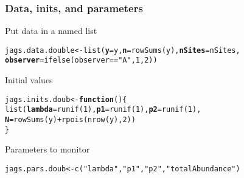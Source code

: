 \documentclass[color=usenames,dvipsnames]{beamer}\usepackage[]{graphicx}\usepackage[]{xcolor}
\makeatletter
\newcommand{\hlnum}[1]{\textcolor[rgb]{0.69,0.494,0}{#1}}%
\newcommand{\hlsng}[1]{\textcolor[rgb]{0.749,0.012,0.012}{#1}}%
\newcommand{\hlopt}[1]{\textcolor[rgb]{0,0,0}{#1}}%
\newcommand{\hldef}[1]{\textcolor[rgb]{0,0,0}{#1}}%
\newcommand{\hlkwa}[1]{\textcolor[rgb]{0,0,0}{\textbf{#1}}}%
\newcommand{\hlkwb}[1]{\textcolor[rgb]{0,0.341,0.682}{#1}}%
\newcommand{\hlkwc}[1]{\textcolor[rgb]{0,0,0}{\textbf{#1}}}%
\newcommand{\hlkwd}[1]{\textcolor[rgb]{0.004,0.004,0.506}{#1}}%
\newenvironment{kframe}{%
 \def\at@end@of@kframe{}%
 \ifinner\ifhmode%
  \def\at@end@of@kframe{\end{minipage}}%
  \begin{minipage}{\columnwidth}%
 \fi\fi%
 \def\FrameCommand##1{\hskip\@totalleftmargin \hskip-\fboxsep
 \colorbox{shadecolor}{##1}\hskip-\fboxsep
     \hskip-\linewidth \hskip-\@totalleftmargin \hskip\columnwidth}%
 \MakeFramed {\advance\hsize-\width
   \@totalleftmargin\z@ \linewidth\hsize
   \@setminipage}}%
 {\par\unskip\endMakeFramed%
 \at@end@of@kframe}
\newenvironment{knitrout}{}{} %
\makeatother
\begin{document}
\begin{frame}[fragile]
  \frametitle{Data, inits, and parameters}
  Put data in a named list
  \vspace{-12pt}
\begin{knitrout}\small
{}\color{fgcolor}\begin{kframe}
\begin{alltt}
\hldef{jags.data.double} \hlkwb{<-} \hlkwd{list}\hldef{(}\hlkwc{y}\hldef{=y,} \hlkwc{n}\hldef{=}\hlkwd{rowSums}\hldef{(y),} \hlkwc{nSites}\hldef{=nSites,}
    \hlkwc{observer}\hldef{=}\hlkwd{ifelse}\hldef{(observer}\hlopt{==}\hlsng{"A"}\hldef{,} \hlnum{1}\hldef{,} \hlnum{2}\hldef{))}
\end{alltt}
\end{kframe}
\end{knitrout}
\pause
\vfill
  Initial values
  \vspace{-12pt}
\begin{knitrout}\small
{}\color{fgcolor}\begin{kframe}
\begin{alltt}
\hldef{jags.inits.doub} \hlkwb{<-} \hlkwa{function}\hldef{() \{}
    \hlkwd{list}\hldef{(}\hlkwc{lambda}\hldef{=}\hlkwd{runif}\hldef{(}\hlnum{1}\hldef{),} \hlkwc{p1}\hldef{=}\hlkwd{runif}\hldef{(}\hlnum{1}\hldef{),} \hlkwc{p2}\hldef{=}\hlkwd{runif}\hldef{(}\hlnum{1}\hldef{),}
         \hlkwc{N}\hldef{=}\hlkwd{rowSums}\hldef{(y)}\hlopt{+}\hlkwd{rpois}\hldef{(}\hlkwd{nrow}\hldef{(y),} \hlnum{2}\hldef{))}
\hldef{\}}
\end{alltt}
\end{kframe}
\end{knitrout}
\pause
\vfill
  Parameters to monitor
  \vspace{-12pt}
\begin{knitrout}\small
{}\color{fgcolor}\begin{kframe}
\begin{alltt}
\hldef{jags.pars.doub} \hlkwb{<-} \hlkwd{c}\hldef{(}\hlsng{"lambda"}\hldef{,} \hlsng{"p1"}\hldef{,} \hlsng{"p2"}\hldef{,} \hlsng{"totalAbundance"}\hldef{)}
\end{alltt}
\end{kframe}
\end{knitrout}
\end{frame}
\end{document}
